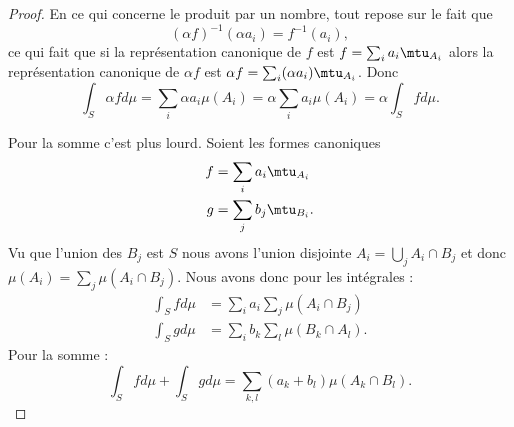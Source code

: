 \begin{proof}
    En ce qui concerne le produit par un nombre, tout repose sur le fait que
    \begin{equation}
        (\alpha f)^{-1}(\alpha a_i)=f^{-1}(a_i),
    \end{equation}
    ce qui fait que si la représentation canonique de \( f\) est \( f=\sum_ia_i\mtu_{A_i}\) alors la représentation canonique de \( \alpha f\) est \( \alpha f=\sum_i(\alpha a_i)\mtu_{A_i}\). Donc
    \begin{equation}
        \int_S\alpha fd\mu=\sum_i\alpha a_i\mu(A_i)=\alpha \sum_ia_i\mu(A_i)=\alpha\int_Sfd\mu.
    \end{equation}

    Pour la somme c'est plus lourd. Soient les formes canoniques
    \begin{subequations}
        \begin{align}
            f&=\sum_ia_i\mtu_{A_i}\\
            g&=\sum_jb_j\mtu_{B_i}.
        \end{align}
    \end{subequations}
    Vu que l'union des \( B_j\) est \( S\) nous avons l'union disjointe \( A_i=\bigcup_jA_i\cap B_j\) et donc \( \mu(A_i)=\sum_j\mu(A_i\cap B_j)\). Nous avons donc pour les intégrales :
    \begin{subequations}
        \begin{align}
            \int_Sfd\mu&=\sum_ia_i\sum_j\mu(A_i\cap B_j)\\
            \int_Sgd\mu&=\sum_ib_k\sum_l\mu(B_k\cap A_l).
        \end{align}
    \end{subequations}
    Pour la somme :
    \begin{equation}
        \int_Sfd\mu+\int_Sgd\mu=\sum_{k,l}(a_k+b_l)\mu(A_k\cap B_l).
    \end{equation}


\end{proof}
